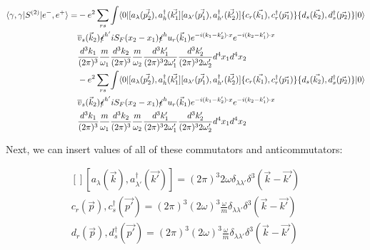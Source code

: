 \documentclass[a4]{article}
\begin{document}
\begin{framed}
            \begin{equation}
                \begin{aligned}
                    \langle \gamma, \gamma | S^{(2)} | e^{-}, e^{+} \rangle = & - e^{2} \sum_{r s} \int \langle 0 |[a_{\lambda} (\vec{p'_2}),a^{\dagger}_{h} (\vec{k'_1}] [a_{\lambda'} (\vec{p'_1}), a^{\dagger}_{h'} (\vec{k'_2})] \{c_{r} (\vec{k_1}), c^{\dagger}_{r} (\vec{p_1}) \} \{d_{s} (\vec{k_2}), d^{\dagger}_{s} (\vec{p_2}) \}| 0 \rangle \\
                    & \overline{v}_{s} (\vec{k}_2) \slashed{\epsilon}^{h'} i S_{F} (x_2 - x_1) \slashed{\epsilon}^{h} u_{r} (\vec{k}_1) e^{- i (k_1 - k'_2) \cdot x} e^{- i (k_2 - k'_1) \cdot x} \\
                    & \frac{d^3 k_1}{(2 \pi)^{3}} \frac{m}{\omega_1} \frac{d^3 k_2}{(2 \pi)^{3}} \frac{m}{\omega_2} \frac{d^3 k'_1}{(2 \pi)^{3} 2 \omega'_1} \frac{d^3 k'_2}{(2 \pi)^{3} 2 \omega'_2} d^4 x_1 d^4 x_2 \\
                    & - e^{2} \sum_{r s} \int \langle 0 |[a_{\lambda} (\vec{p'_2}),a^{\dagger}_{h} (\vec{k'_1}] [a_{\lambda'} (\vec{p'_1}), a^{\dagger}_{h'} (\vec{k'_2})] \{c_{r} (\vec{k_1}), c^{\dagger}_{r} (\vec{p_1}) \} \{d_{s} (\vec{k_2}), d^{\dagger}_{s} (\vec{p_2}) \}| 0 \rangle \\
                    & \overline{v}_{s} (\vec{k}_2) \slashed{\epsilon}^{h'} i S_{F} (x_2 - x_1) \slashed{\epsilon}^{h} u_{r} (\vec{k}_1) e^{- i (k_1 - k'_2) \cdot x} e^{- i (k_2 - k'_1) \cdot x} \\
                    & \frac{d^3 k_1}{(2 \pi)^{3}} \frac{m}{\omega_1} \frac{d^3 k_2}{(2 \pi)^{3}} \frac{m}{\omega_2} \frac{d^3 k'_1}{(2 \pi)^{3} 2 \omega'_1} \frac{d^3 k'_2}{(2 \pi)^{3} 2 \omega'_2} d^4 x_1 d^4 x_2
                \end{aligned}
            \end{equation}

            Next, we can insert values of all of these commutators and anticommutators:

            \begin{equation}
                \begin{aligned} []
                    [a_{\lambda} (\vec{k}), a^{\dag}_{\lambda'} (\vec{k'})] = (2 \pi)^{3} 2 \omega \delta_{\lambda \lambda'} \delta^{3} (\vec{k} - \vec{k'}) \\
                    {c_{r} (\vec{p}), c^{\dag}_{s} (\vec{p'})} = (2 \pi)^{3} (2 \omega)^{3} \frac{\omega}{m} \delta_{\lambda \lambda'} \delta^{3} (\vec{k} - \vec{k'}) \\
                    {d_{r} (\vec{p}), d^{\dag}_{s} (\vec{p'})} = (2 \pi)^{3} (2 \omega)^{3} \frac{\omega}{m} \delta_{\lambda \lambda'} \delta^{3} (\vec{k} - \vec{k'})
                \end{aligned}
            \end{equation}


\end{framed}
\end{document}
